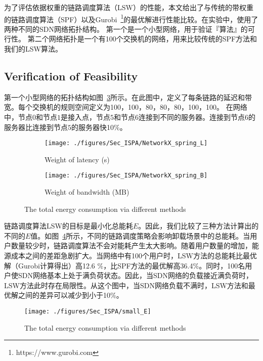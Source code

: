 为了评估依据权重的链路调度算法（LSW）的性能，本文给出了与传统的带权重的链路调度算法（SPF）以及Gurobi~\footnote{https://www.gurobi.com}的最优解进行性能比较。在实验中，使用了两种不同的SDN网络拓扑结构。 第一个是一个小型网络，用于验证『算法』的可行性。 第二个网络拓扑是一个有100个交换机的网络，用来比较传统的SPF方法和我们的LSW算法。

\subsection{Verification of Feasibility}

第一个小型网络的拓扑结构如图~\ref{fig_smallNetwork}所示。在此图中，定义了每条链路的延迟和带宽。每个交换机的规则空间定义为100，100，80，80，80，100，100。 在网络中，节点$0$和节点$1$是接入点，节点$5$和节点$6$连接到不同的服务器。连接到节点$6$的服务器比连接到节点$5$的服务器快10\%。

\begin{figure}[!h]
  \centering
  \begin{subfigure}[b]{0.45\linewidth}
    \texttt{[image: ./figures/Sec\_ISPA/NetworkX\_spring\_L]}
    \label{fig_smallNetworkL}
    \caption{Weight of latency (s)}
  \end{subfigure} %
  \begin{subfigure}[b]{0.45\linewidth}    
    \texttt{[image: ./figures/Sec\_ISPA/NetworkX\_spring\_B]}
    \label{fig_smallNetworkB}    
    \caption{Weight of bandwidth (MB)}
  \end{subfigure} 
  \caption{The total energy consumption via different methods}
  \label{fig_smallNetwork}
\end{figure}

链路调度算法LSW的目标是最小化总能耗$E$。因此，我们比较了三种方法计算出的不同的$E$值。如图~\ref{fig_smallE}所示，不同的链路调度策略会影响卸载场景中的总能耗。当用户数量较少时，链路调度算法不会对能耗产生太大影响。随着用户数量的增加，能源成本之间的差距急剧扩大。当网络中有100个用户时，LSW方法的总能耗比最优解（Gurobi计算得出）高12.6 \%，比SPF方法的最优解高36.4\%。同时，100名用户使SDN网络基本上处于满负荷状态。因此，当SDN网络的负载接近满负荷时，LSW方法此时存在局限性。从这个图中，当SDN网络负载不满时，LSW方法和最优解之间的差异可以减少到小于10\%。

\begin{figure}[!h]
\centering
\texttt{[image: ./figures/Sec\_ISPA/small\_E]}
\vspace{-1em}
\caption{The total energy consumption via different methods}
\vspace{-0.5em}
\label{fig_smallE}
\end{figure}


